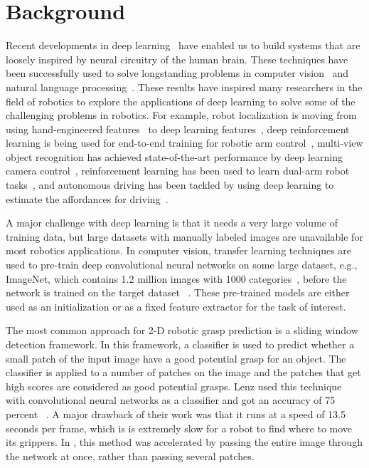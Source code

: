 \documentclass[10pt,twocolumn,letterpaper]{article}
\begin{document}
\section{Background}
Recent developments in deep learning~\cite{cite-key} have enabled us to build systems that are loosely inspired by neural circuitry of the human brain. These techniques have been successfully used to solve longstanding problems in computer vision~\cite{NIPS2012_4824,russakovsky2015imagenet,Taigman_2014_CVPR} and natural language processing~\cite{sutskever2014sequence,cho2014learning,socher2011dynamic}. These results have inspired many researchers in the field of robotics to explore the applications of deep learning to solve some of the challenging problems in robotics. For example, robot localization is moving from using hand-engineered features~\cite{johns2014generative} to deep learning features~\cite{sunderhauf2015performance}, deep reinforcement learning is being used for end-to-end training for robotic arm control~\cite{levine2016end}, multi-view object recognition has achieved state-of-the-art performance by deep learning camera control~\cite{johns2016pairwise}, reinforcement learning has been used to learn dual-arm robot tasks~\cite{kumra2015dual}, and  autonomous driving has been tackled by using deep learning to estimate the affordances for driving~\cite{chen2015deepdriving}.

A major challenge with deep learning is that it needs a very large volume of training data, but large datasets with manually labeled images are unavailable for most robotics applications. In computer vision, transfer learning techniques are used to pre-train deep convolutional neural networks on some large dataset, e.g., ImageNet, which contains 1.2 million images with 1000 categories~\cite{imagenet_cvpr09}, before the network is trained on the target dataset ~\cite{yosinski2014transferable}. These pre-trained models are either used as an initialization or as a fixed feature extractor for the task of interest.

The most common approach for 2-D robotic grasp prediction is a sliding window detection framework. In this framework, a classifier is used to predict whether a small patch of the input image have a good potential grasp for an object. The classifier is applied to a number of patches on the image and the patches that get high scores are considered as good potential grasps. Lenz \etal used this technique with convolutional neural networks as a classifier and got an accuracy of 75 percent ~\cite{lenz2015deep}. A major drawback of their work was that it runs at a speed of 13.5 seconds per frame, which is is extremely slow for a robot to find where to move its grippers. In \cite{Redmon}, this method was accelerated by passing the entire image through the network at once, rather than passing several patches.
\end{document}
